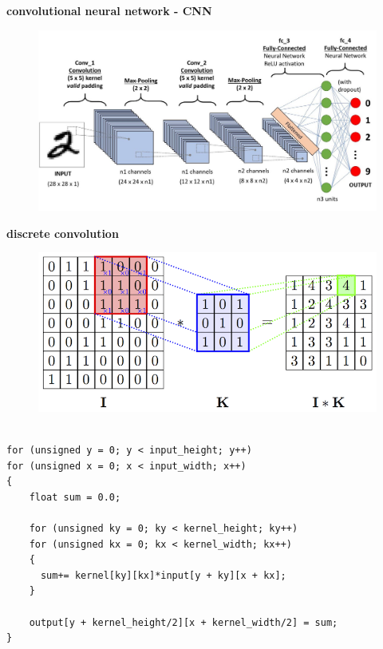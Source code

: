 \documentclass[xcolor=dvipsnames]{beamer}
\begin{document}
\begin{frame}{\bf convolutional neural network - CNN}

  \begin{figure}
    \includegraphics[scale=0.2]{../images/cnn.jpg}
  \end{figure}

\end{frame}




\begin{frame}[fragile]
{\bf discrete convolution}

\begin{figure}
  \includegraphics[scale=0.2]{../images/convolution_2d.png}
\end{figure}


\begin{lstlisting}

for (unsigned y = 0; y < input_height; y++)
for (unsigned x = 0; x < input_width; x++)
{
    float sum = 0.0;

    for (unsigned ky = 0; ky < kernel_height; ky++)
    for (unsigned kx = 0; kx < kernel_width; kx++)
    {
      sum+= kernel[ky][kx]*input[y + ky][x + kx];
    }

    output[y + kernel_height/2][x + kernel_width/2] = sum;
}
\end{lstlisting}
\end{frame}
\end{document}
